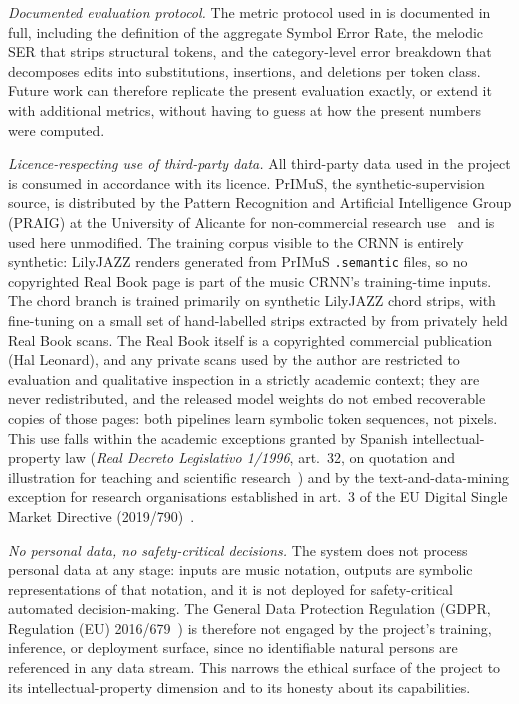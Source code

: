 \textit{Documented evaluation protocol.}
The metric protocol used in  is documented
in full, including the definition of the aggregate Symbol Error
Rate, the melodic SER that strips structural tokens, and the
category-level error breakdown that decomposes edits into
substitutions, insertions, and deletions per token class.
Future work can therefore replicate the present evaluation
exactly, or extend it with additional metrics, without having to
guess at how the present numbers were computed.

\textit{Licence-respecting use of third-party data.}
All third-party data used in the project is consumed in
accordance with its licence.
PrIMuS, the synthetic-supervision source, is distributed by the Pattern
Recognition and Artificial Intelligence Group (PRAIG) at the University of
Alicante for non-commercial research use~\cite{PrIMuSDataset} and is used
here unmodified.
The training corpus visible to the CRNN is entirely synthetic:
LilyJAZZ renders generated from PrIMuS \texttt{.semantic} files, so
no copyrighted Real Book page is part of the music CRNN's
training-time inputs.
The chord branch is trained primarily on synthetic LilyJAZZ chord
strips, with fine-tuning on a small set of hand-labelled strips
extracted by  from privately held
Real Book scans.
The Real Book itself is a copyrighted commercial publication (Hal
Leonard), and any private scans used by the author are restricted
to evaluation and qualitative inspection in a strictly academic
context; they are never redistributed, and the released model
weights do not embed recoverable copies of those pages: both pipelines
learn symbolic token sequences, not pixels.
This use falls within the academic exceptions granted by Spanish
intellectual-property law (\textit{Real Decreto Legislativo
1/1996}, art.~32, on quotation and illustration for teaching and
scientific research~\cite{spainLPI1996}) and by the text-and-data-mining
exception for research organisations established in art.~3 of the EU
Digital Single Market Directive (2019/790)~\cite{euDSMDirective2019}.

\textit{No personal data, no safety-critical decisions.}
The system does not process personal data at any stage: inputs are
music notation, outputs are symbolic representations of that
notation, and it is not deployed for safety-critical automated
decision-making.
The General Data Protection Regulation (GDPR,
Regulation (EU) 2016/679~\cite{euGDPR2016}) is therefore not engaged
by the project's training, inference, or deployment surface, since
no identifiable natural persons are referenced in any data stream.
This narrows the ethical surface of the project to its
intellectual-property dimension and to its honesty about its
capabilities.

